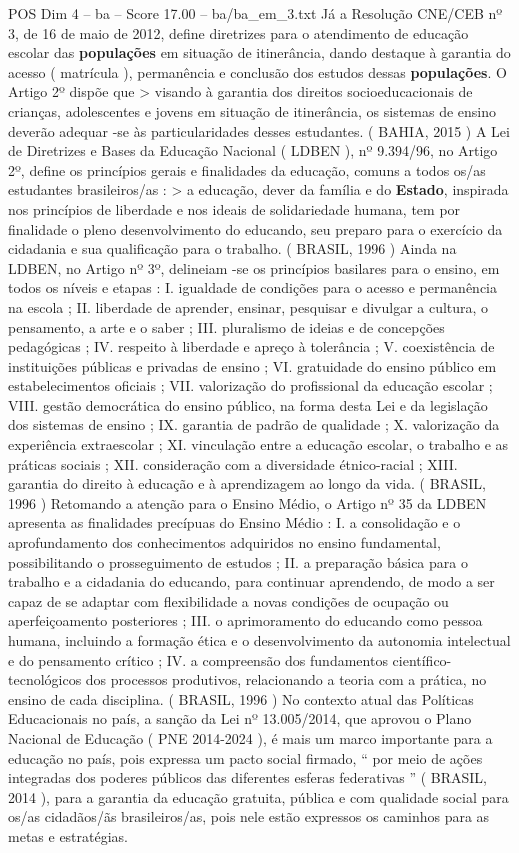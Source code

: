 \begin{textsample}{POS Dim 4 – ba – Score 17.00 – ba/ba\_em\_3.txt}
Já a Resolução CNE/CEB nº 3, de 16 de maio de 2012, define diretrizes para o atendimento de educação escolar das \textbf{populações} em situação de itinerância, dando destaque à garantia do acesso ( matrícula ), permanência e conclusão dos estudos dessas \textbf{populações}.
O Artigo 2º dispõe que > visando à garantia dos direitos socioeducacionais de crianças, adolescentes e jovens em situação de itinerância, os sistemas de ensino deverão adequar -se às particularidades desses estudantes. ( BAHIA, 2015 ) A Lei de Diretrizes e Bases da Educação Nacional ( LDBEN ), nº 9.394/96, no Artigo 2º, define os princípios gerais e finalidades da educação, comuns a todos os/as estudantes brasileiros/as : > a educação, dever da família e do \textbf{Estado}, inspirada nos princípios de liberdade e nos ideais de solidariedade humana, tem por finalidade o pleno desenvolvimento do educando, seu preparo para o exercício da cidadania e sua qualificação para o trabalho. ( BRASIL, 1996 ) Ainda na LDBEN, no Artigo nº 3º, delineiam -se os princípios basilares para o ensino, em todos os níveis e etapas : I. igualdade de condições para o acesso e permanência na escola ; II. liberdade de aprender, ensinar, pesquisar e divulgar a cultura, o pensamento, a arte e o saber ; III. pluralismo de ideias e de concepções pedagógicas ; IV. respeito à liberdade e apreço à tolerância ; V. coexistência de instituições públicas e privadas de ensino ; VI. gratuidade do ensino público em estabelecimentos oficiais ; VII. valorização do profissional da educação escolar ; VIII. gestão democrática do ensino público, na forma desta Lei e da legislação dos sistemas de ensino ; IX. garantia de padrão de qualidade ; X. valorização da experiência extraescolar ; XI. vinculação entre a educação escolar, o trabalho e as práticas sociais ; XII. consideração com a diversidade étnico-racial ; XIII. garantia do direito à educação e à aprendizagem ao longo da vida. ( BRASIL, 1996 ) Retomando a atenção para o Ensino Médio, o Artigo nº 35 da LDBEN apresenta as finalidades precípuas do Ensino Médio : I. a consolidação e o aprofundamento dos conhecimentos adquiridos no ensino fundamental, possibilitando o prosseguimento de estudos ; II. a preparação básica para o trabalho e a cidadania do educando, para continuar aprendendo, de modo a ser capaz de se adaptar com flexibilidade a novas condições de ocupação ou aperfeiçoamento posteriores ; III. o aprimoramento do educando como pessoa humana, incluindo a formação ética e o desenvolvimento da autonomia intelectual e do pensamento crítico ; IV. a compreensão dos fundamentos científico-tecnológicos dos processos produtivos, relacionando a teoria com a prática, no ensino de cada disciplina. ( BRASIL, 1996 ) No contexto atual das Políticas Educacionais no país, a sanção da Lei nº 13.005/2014, que aprovou o Plano Nacional de Educação ( PNE 2014-2024 ), é mais um marco importante para a educação no país, pois expressa um pacto social firmado, “ por meio de ações integradas dos poderes públicos das diferentes esferas federativas ” ( BRASIL, 2014 ), para a garantia da educação gratuita, pública e com qualidade social para os/as cidadãos/ãs brasileiros/as, pois nele estão expressos os caminhos para as metas e estratégias.

\end{textsample}
